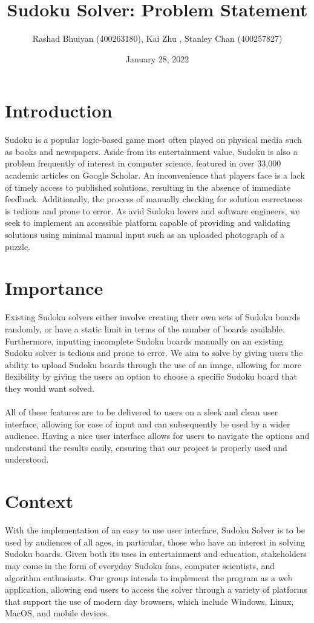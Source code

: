 \documentclass[11pt]{article}
\title{Sudoku Solver: Problem Statement}
\author{Rashad Bhuiyan (400263180), Kai Zhu , Stanley Chan (400257827)}
\date{January 28, 2022}
\begin{document}
\maketitle

\section{Introduction}
Sudoku is a popular logic-based game most often played on physical media such as books and newspapers. Aside from its entertainment value, Sudoku is also a problem frequently of interest in computer science, featured in over 33,000 academic articles on Google Scholar. An inconvenience that players face is a lack of timely access to published solutions, resulting in the absence of immediate feedback. Additionally, the process of manually checking for solution correctness is tedious and prone to error. As avid Sudoku lovers and software engineers, we seek to implement an accessible platform capable of providing and validating solutions using minimal manual input such as an uploaded photograph of a puzzle.


\section{Importance}
Existing Sudoku solvers either involve creating their own sets of Sudoku boards randomly, or have a static limit in terms of the number of boards available. Furthermore, inputting incomplete Sudoku boards manually on an existing Sudoku solver is tedious and prone to error. We aim to solve by giving users the ability to upload Sudoku boards through the use of an image, allowing for more flexibility by giving the users an option to choose a specific Sudoku board that they would want solved. 
\\
\\
All of these features are to be delivered to users on a sleek and clean user interface, allowing for ease of input and can subsequently be used by a wider audience. Having a nice user interface allows for users to navigate the options and understand the results easily, ensuring that our project is properly used and understood.

\section{Context}
With the implementation of an easy to use user interface, Sudoku Solver is to be used by audiences of all ages, in particular, those who have an interest in solving Sudoku boards. Given both its uses in entertainment and education, stakeholders may come in the form of everyday Sudoku fans, computer scientists, and algorithm enthusiasts. Our group intends to implement the program as a web application, allowing end users to access the solver through a variety of platforms that support the use of modern day browsers, which include Windows, Linux, MacOS, and mobile devices.
\end{document}
